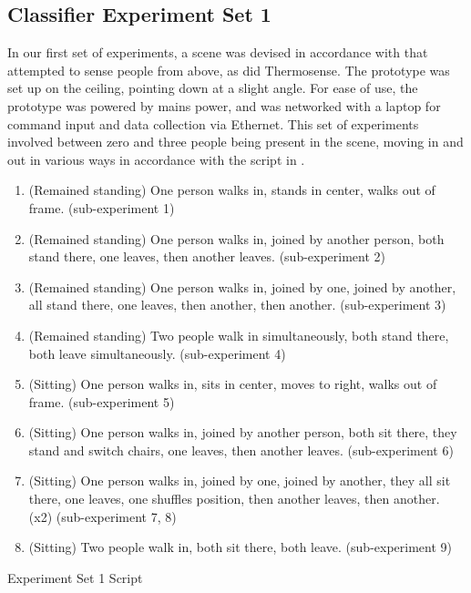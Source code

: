 \documentclass[../thesis/thesis.tex]{subfiles}
\begin{document}
\subsection{Classifier Experiment Set 1}
In our first set of experiments, a scene was devised in accordance with  that attempted to sense people from above, as did Thermosense. The prototype was set up on the ceiling, pointing down at a slight angle. For ease of use, the prototype was powered by mains power, and was networked with a laptop for command input and data collection via Ethernet. This set of experiments involved between zero and three people being present in the scene, moving in and out in various ways in accordance with the script in .

\begin{table}
\centering
\begin{enumerate}
\item (Remained standing) One person walks in, stands in center, walks out of frame. (sub-experiment 1)
\item (Remained standing) One person walks in, joined by another person, both stand there, one leaves, then another leaves. (sub-experiment 2)
\item (Remained standing) One person walks in, joined by one, joined by another, all stand there, one leaves, then another, then another. (sub-experiment 3)
\item (Remained standing) Two people walk in simultaneously, both stand there, both leave simultaneously. (sub-experiment 4)
\item (Sitting) One person walks in, sits in center, moves to right, walks out of frame. (sub-experiment 5)
\item (Sitting) One person walks in, joined by another person, both sit there, they stand and switch chairs, one leaves, then another leaves. (sub-experiment 6)
\item (Sitting) One person walks in, joined by one, joined by another, they all sit there, one leaves, one shuffles position, then another leaves, then another. (x2) (sub-experiment 7, 8)
\item (Sitting) Two people walk in, both sit there, both leave. (sub-experiment 9)
\end{enumerate}
\caption{Experiment Set 1 Script}
\label{tab:exps:3script}
\end{table}
\end{document}
